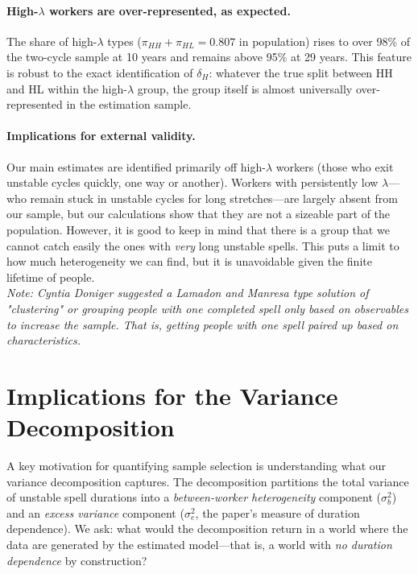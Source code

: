 \documentclass[12pt,a4paper]{article}
\begin{document}
\paragraph{High-$\lambda$ workers are over-represented, as expected.}
The share of high-$\lambda$ types ($\pi_{HH} + \pi_{HL} = 0.807$ in population) rises
to over 98\% of the two-cycle sample at 10 years and remains above 95\% at 29 years.
This feature is robust to the exact identification of $\delta_H$: whatever the true
split between HH and HL within the high-$\lambda$ group, the group itself is almost
universally over-represented in the estimation sample.

\paragraph{Implications for external validity.}
Our main estimates are identified primarily off high-$\lambda$ workers (those who exit
unstable cycles quickly, one way or another). Workers with persistently low
$\lambda$---who remain stuck in unstable cycles for long stretches---are largely
absent from our sample, but our calculations show that they are not a sizeable part of the population. However, it is good to keep in mind that there is a group that we cannot catch easily the ones with \textit{very} long unstable spells. This puts a limit to how much heterogeneity we can find, but it is unavoidable given the finite lifetime of people.\\

\textit{Note: Cyntia Doniger suggested a Lamadon and Manresa type solution of "clustering" or grouping people with one completed spell only based on observables to increase the sample. That is, getting people with one spell paired up based on characteristics.}

\section{Implications for the Variance Decomposition}

A key motivation for quantifying sample selection is understanding what our variance
decomposition captures. The decomposition partitions the total variance of unstable spell
durations into a \emph{between-worker heterogeneity} component ($\sigma_b^2$) and an
\emph{excess variance} component ($\sigma_e^2$, the paper's measure of duration
dependence). We ask: what would the decomposition return in a world where the data are
generated by the estimated model---that is, a world with \emph{no duration dependence}
by construction?
\end{document}
